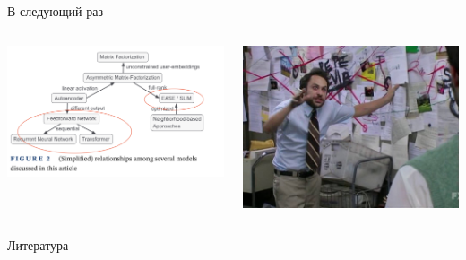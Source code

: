 \documentclass[11pt,aspectratio=169,handout=true]{beamer}
\begin{document}
\begin{frame}{В следующий раз}

\begin{columns}

\begin{column}{0.47\textwidth} 
\begin{center}
\includegraphics[scale=0.3]{images/relationships.png}
\end{center}
\end{column}

\begin{column}{0.47\textwidth}
\begin{center}
\includegraphics[scale=0.15]{images/conspiracy.jpeg}
\end{center}
\end{column}

\end{columns}

\end{frame}

\begin{frame}[allowframebreaks]{Литература}




\end{frame}
\end{document}
